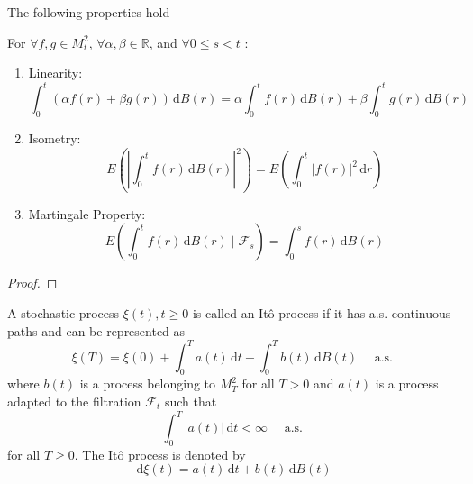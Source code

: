 \begin{definition}

\end{definition}

The following properties hold

\begin{property}
    For $\forall f,g\in M_{t}^{2}$, $\forall\alpha,\beta\in\mathbb{R}$, and $\forall 0\leq s<t$ :
    \begin{enumerate}
        \item Linearity:
              \begin{equation}
                  \int_{0}^{t}(\alpha f(r)+\beta g(r))\,\mathrm{d}B(r)=\alpha \int_{0}^{t}f(r)\,\mathrm{d}B(r)+\beta\int_{0}^{t}g(r)\,\mathrm{d}B(r)
              \end{equation}
        \item Isometry:
              \begin{equation}
                  E\left(\left|\int_{0}^{t}f(r)\,\mathrm{d}B(r)\right|^{2}\right)=E\left(\int_{0}^{t}|f(r)|^{2}\,\mathrm{d}r\right)
              \end{equation}
        \item Martingale Property:
              \begin{equation}
                  E\left(\int_{0}^{t}f(r)\,\mathrm{d}B(r)\mid\mathcal{F}_{s}\right)=\int_{0}^{s}f(r)\,\mathrm{d}B(r)
              \end{equation}
    \end{enumerate}
\end{property}

\begin{proof}

\end{proof}

\begin{definition}
    A stochastic process $\xi(t),t\geq 0$ is called an Itô process if it has a.s. continuous paths and can be represented as
    \begin{equation}
        \xi(T)=\xi(0)+\int_{0}^{T}a(t)\,\mathrm{d}t+\int_{0}^{T}b(t)\,\mathrm{d}B(t)\quad\text { a.s. }
    \end{equation}
    where $b(t)$ is a process belonging to $M_{T}^{2}$ for all $T>0$ and $a(t)$ is a process adapted to the filtration $\mathcal{F}_{t}$ such that
    \begin{equation}
        \int_{0}^{T}|a(t)|\,\mathrm{d}t<\infty\quad\text { a.s. } \label{eq:condition-of-process-adapted-to-filtration}
    \end{equation}
    for all $T\geq 0$.
    The Itô process is denoted by
    \begin{equation}
        \mathrm{d}\xi(t)=a(t)\,\mathrm{d}t+b(t)\,\mathrm{d}B(t)
    \end{equation}
\end{definition}

